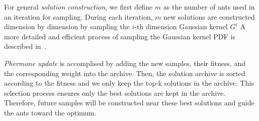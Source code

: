 For general \textit{solution construction}, we first define $m$ as the number of ants used in an iteration for sampling.
During each iteration, $m$ new solutions are constructed dimension by dimension by sampling the $i$-th dimension Gaussian kernel $G^i$
A more detailed and efficient process of sampling the Gaussian kernel PDF is described in~\cite{Socha:2008:ACOR}.

\textit{Phermone update} is accomplised by adding the new samples, their fitness, and the corresponding weight into the archive.
Then, the solution archive is sorted according to the fitness and we only keep the top-k solutions in the archive.
This selection process ensures only the best solutions are kept in the archive.
Therefore, future samples will be constructed near these best solutions and guide the ants toward the optimum.





